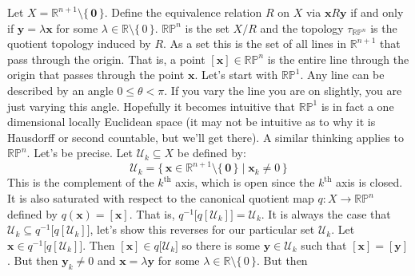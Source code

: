 \documentclass{article}
\theoremstyle{plain}
\theoremstyle{normal}
\newenvironment{example}{%
    \pushQED{\qed}\renewcommand{\qedsymbol}{$\blacksquare$}\examplex%
}{%
    \popQED\endexamplex%
}
\begin{document}
        \begin{example}[\textbf{Real Projective Space}]
            Let $X=\mathbb{R}^{n+1}\setminus\{\,\mathbf{0}\,\}$. Define the
            equivalence relation $R$ on $X$ via $\mathbf{x}R\mathbf{y}$ if and
            only if $\mathbf{y}=\lambda\mathbf{x}$ for some
            $\lambda\in\mathbb{R}\setminus\{\,0\,\}$. $\mathbb{RP}^{n}$ is the
            set $X/R$ and the topology $\tau_{\mathbb{RP}^{n}}$ is the
            quotient topology induced by $R$. As a set this is the set of all
            lines in $\mathbb{R}^{n+1}$ that pass through the origin. That is,
            a point $[\mathbf{x}]\in\mathbb{RP}^{n}$ is the entire line through
            the origin that passes through the point $\mathbf{x}$. Let's start
            with $\mathbb{RP}^{1}$. Any line can be described by an angle
            $0\leq\theta<\pi$. If you vary the line you are on slightly, you
            are just varying this angle. Hopefully it becomes intuitive that
            $\mathbb{RP}^{1}$ is in fact a one dimensional locally Euclidean
            space (it may not be intuitive as to why it is Hausdorff or
            second countable, but we'll get there). A similar thinking applies
            to $\mathbb{RP}^{n}$. Let's be precise. Let
            $\mathcal{U}_{k}\subseteq{X}$ be defined by:
            \begin{equation}
                \mathcal{U}_{k}
                =\{\,\mathbf{x}\in\mathbb{R}^{n+1}\setminus\{\,\mathbf{0}\,\}\;
                    |\;\mathbf{x}_{k}\ne{0}\,\}
            \end{equation}
            This is the complement of the $k^{\textrm{th}}$ axis, which is open
            since the $k^{\textrm{th}}$ axis is closed. It is also saturated
            with respect to the canonical quotient map
            $q:X\rightarrow\mathbb{RP}^{n}$ defined by
            $q(\mathbf{x})=[\mathbf{x}]$. That is,
            $q^{-1}\big[q[\mathcal{U}_{k}]\big]=\mathcal{U}_{k}$. It is always
            the case that
            $\mathcal{U}_{k}\subseteq{q}^{-1}\big[q[\mathcal{U}_{k}]\big]$,
            let's show this reverses for our particular set $\mathcal{U}_{k}$.
            Let $\mathbf{x}\in{q}^{-1}\big[q[\mathcal{U}_{k}]\big]$. Then
            $[\mathbf{x}]\in{q}\big[\mathcal{U}_{k}\big]$ so there is some
            $\mathbf{y}\in\mathcal{U}_{k}$ such that
            $[\mathbf{x}]=[\mathbf{y}]$. But then
            $\mathbf{y}_{k}\ne{0}$ and $\mathbf{x}=\lambda\mathbf{y}$ for some
            $\lambda\in\mathbb{R}\setminus\{\,0\,\}$. But then

\end{example}
\end{document}

